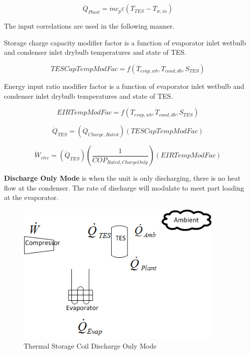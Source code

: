 \begin{equation}
  {\dot Q_{Plant}} = \dot m{c_p}\varepsilon \left( {{T_{TES}} - {T_{w,in}}} \right)
\end{equation}

The input correlations are used in the following manner.

Storage charge capacity modifier factor is a function of evaporator inlet wetbulb and condenser inlet drybulb temperatures and state of TES.

\begin{equation}
TESCapTempModFac = f\left( {{T_{evap,wb}},{T_{cond,db}},{S_{TES}}} \right)
\end{equation}

Energy input ratio modifier factor is a function of evaporator inlet wetbulb and condenser inlet drybulb temperatures and state of TES.

\begin{equation}
EIRTempModFac = f\left( {{T_{evap,wb}},{T_{cond,db}},{S_{TES}}} \right)
\end{equation}

\begin{equation}
{\dot Q_{TES}} = \left( {{{\dot Q}_{Charge,Rated}}} \right)\left( {TESCapTempModFac} \right)
\end{equation}

\begin{equation}
{\dot W_{elec}} = \left( {{{\dot Q}_{TES}}} \right)\left( {\frac{1}{{CO{P_{Rated,ChargeOnly}}}}} \right)\left( {EIRTempModFac} \right)
\end{equation}

\textbf{Discharge Only Mode} is when the unit is only discharging, there is no heat flow at the condenser. The rate of discharge will modulate to meet part loading at the evaporator.

\begin{figure}[hbtp] %
\centering
\includegraphics[width=0.9\textwidth, height=0.9\textheight, keepaspectratio=true]{media/image4366.png}
\caption{Thermal Storage Coil Discharge Only Mode \protect \label{fig:thermal-storage-coil-discharge-only-mode}}
\end{figure}

